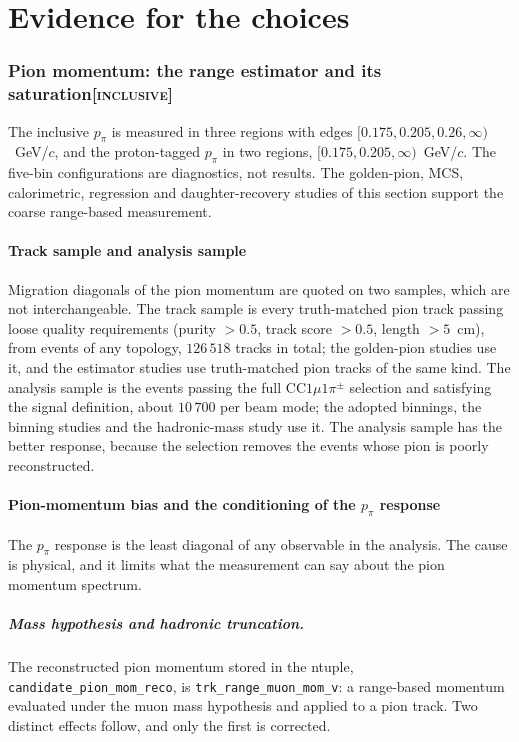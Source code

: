 \documentclass[11pt,a4paper]{article}
\newcommand{\scopetag}[1]{\hfill{\normalfont\small\textsc{[#1]}}}
\begin{document}
\part{Evidence for the choices}
\section[Pion momentum: the range estimator and its saturation]{Pion momentum: the range estimator and its saturation\scopetag{inclusive}}
\label{sec:supp_ppi}

The inclusive $p_\pi$ is measured in three regions with edges $[0.175, 0.205, 0.26, \infty)$~GeV/$c$,
and the proton-tagged $p_\pi$ in two regions, $[0.175, 0.205, \infty)$~GeV/$c$. The five-bin
configurations are diagnostics, not results. The golden-pion, MCS, calorimetric, regression and
daughter-recovery studies of this section support the coarse range-based measurement.

\subsection{Track sample and analysis sample}
\label{sec:ppi_samples}

Migration diagonals of the pion momentum are quoted on two samples, which are not interchangeable. The
track sample is every truth-matched pion track passing loose quality requirements (purity
$>0.5$, track score $>0.5$, length $>5$~cm), from events of any topology, $126\,518$ tracks in
total; the golden-pion studies use it, and the estimator studies use truth-matched pion tracks of the
same kind. The analysis sample is the events passing the full
CC$1\mu1\pi^\pm$ selection and satisfying the signal definition, about $10\,700$ per beam
mode; the adopted binnings, the binning studies and the hadronic-mass study use it. The analysis
sample has the better response, because the selection removes the events whose pion is poorly
reconstructed.

\subsection{Pion-momentum bias and the conditioning of the $p_\pi$ response}
\label{sec:ppi_bias}

The $p_\pi$ response is the least diagonal of any observable in the analysis. The cause is
physical, and it limits what the measurement can say about the pion momentum spectrum.

\subsubsection{Mass hypothesis and hadronic truncation.}
The reconstructed pion momentum stored in the ntuple,
\texttt{candidate\_pion\_mom\_reco}, is \texttt{trk\_range\_muon\_mom\_v}: a range-based
momentum evaluated under the muon mass hypothesis and applied to a pion track. Two
distinct effects follow, and only the first is corrected.
\end{document}
